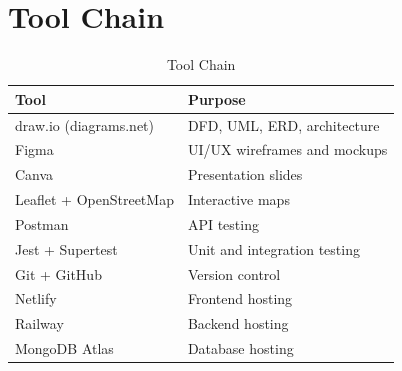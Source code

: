 \section{Tool Chain}
\begin{table}[H]
\centering
\caption{Tool Chain}
\label{tab:tools}
\begin{tabularx}{\textwidth}{@{}lX@{}}
\toprule
Tool & Purpose \\
\midrule
draw.io (diagrams.net) & DFD, UML, ERD, architecture \\
Figma & UI/UX wireframes and mockups \\
Canva & Presentation slides \\
Leaflet + OpenStreetMap & Interactive maps \\
Postman & API testing \\
Jest + Supertest & Unit and integration testing \\
Git + GitHub & Version control \\
Netlify & Frontend hosting \\
Railway & Backend hosting \\
MongoDB Atlas & Database hosting \\
\bottomrule
\end{tabularx}
\end{table}
